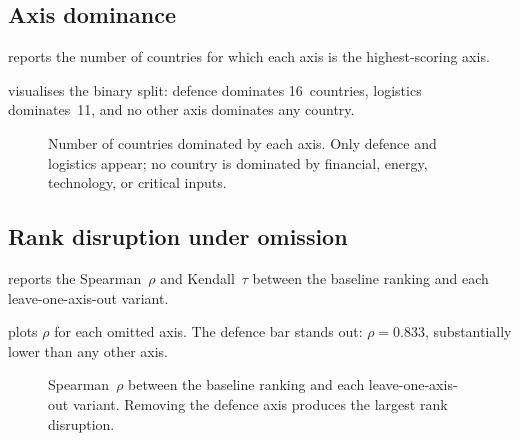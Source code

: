 \subsection{Axis dominance}

 reports the number of countries for
which each axis is the highest-scoring axis.



 visualises the binary split: defence
dominates 16~countries, logistics dominates~11, and no other axis
dominates any country.

\begin{figure}[htbp]
  \centering
  
  \caption{Number of countries dominated by each axis.
    Only defence and logistics appear; no country is dominated by
    financial, energy, technology, or critical inputs.}
  \label{fig:dominance-share}
\end{figure}

\subsection{Rank disruption under omission}

 reports the Spearman~$\rho$ and
Kendall~$\tau$ between the baseline ranking and each
leave-one-axis-out variant.



 plots $\rho$ for each omitted axis.  The
defence bar stands out: $\rho = 0.833$, substantially lower than
any other axis.

\begin{figure}[htbp]
  \centering
  
  \caption{Spearman~$\rho$ between the baseline ranking and each
    leave-one-axis-out variant.  Removing the defence axis produces
    the largest rank disruption.}
  \label{fig:loo-rho}
\end{figure}
